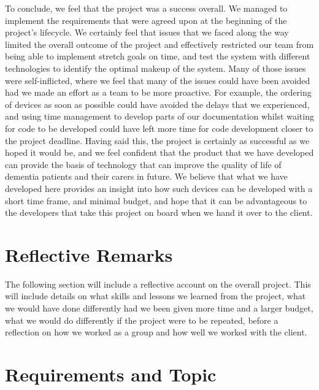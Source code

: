             To conclude, we feel that the project was a success overall. We managed to implement the requirements that were agreed upon at the beginning of the project's lifecycle. We certainly feel that issues that we faced along the way limited the overall outcome of the project and effectively restricted our team from being able to implement stretch goals on time, and test the system with different technologies to identify the optimal makeup of the system. Many of those issues were self-inflicted, where we feel that many of the issues could have been avoided had we made an effort as a team to be more proactive. For example, the ordering of devices as soon as possible could have avoided the delays that we experienced, and using time management to develop parts of our documentation whilst waiting for code to be developed could have left more time for code development closer to the project deadline. Having said this, the project is certainly as successful as we hoped it would be, and we feel confident that the product that we have developed can provide the basis of technology that can improve the quality of life of dementia patients and their carers in future. We believe that what we have developed here provides an insight into how such devices can be developed with a short time frame, and minimal budget, and hope that it can be advantageous to the developers that take this project on board when we hand it over to the client.

    
    \section{Reflective Remarks}

        The following section will include a reflective account on the overall project. This will include details on what skills and lessons we learned from the project, what we would have done differently had we been given more time and a larger budget, what we would do differently if the project were to be repeated, before a reflection on how we worked as a group and how well we worked with the client.

    \section{Requirements and Topic}
    \label{sec:reqs}

